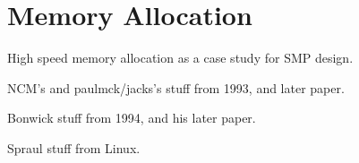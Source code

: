
\chapter{Memory Allocation}
\label{chp:Memory Allocation}

High speed memory allocation as a case study for SMP design.

NCM's and paulmck/jacks's stuff from 1993, and later paper.

Bonwick stuff from 1994, and his later paper.

Spraul stuff from Linux.
